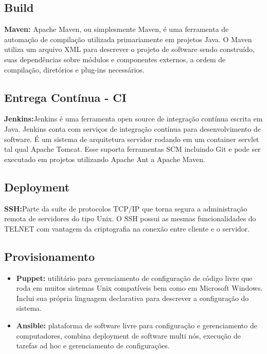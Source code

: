 \subsection{Build}

\textbf{Maven:} Apache Maven, ou simplesmente Maven, é uma ferramenta de automação de compilação utilizada primariamente em projetos Java. O Maven utiliza um arquivo XML para descrever o projeto de software sendo construído, suas dependências sobre módulos e componentes externos, a ordem de compilação, diretórios e plug-ins necessários.

\subsection{Entrega Contínua - CI}
\textbf{Jenkins:}Jenkins é uma ferramenta open source de integração contínua escrita em Java. Jenkins conta com serviços de integração contínua para desenvolvimento de software. É um sistema de arquitetura servidor rodando em um container servlet tal qual Apache Tomcat. Esse suporta ferramentas SCM incluindo Git e pode ser executado em projetos utilizando Apache Ant a Apache Maven.

\subsection{Deployment}
\textbf{SSH:}Parte da suíte de protocolos TCP/IP que torna segura a administração remota de servidores do tipo Unix. O SSH possui as mesmas funcionalidades do TELNET com vantagem da criptografia na conexão entre cliente e o servidor.

\subsection{Provisionamento}

\begin{itemize}

\item \textbf{Puppet:} utilitário para gerenciamento de configuração de código livre que roda em muitos sistemas Unix compatíveis bem como em Microsoft Windows. Inclui sua própria linguagem declarativa para descrever a configuração do sistema.

\item \textbf{Ansible:} plataforma de software livre para configuração e gerenciamento de computadores, combina deployment de software multi nós, execução de tarefas ad hoc e gerenciamento de configurações.

\end{itemize}

